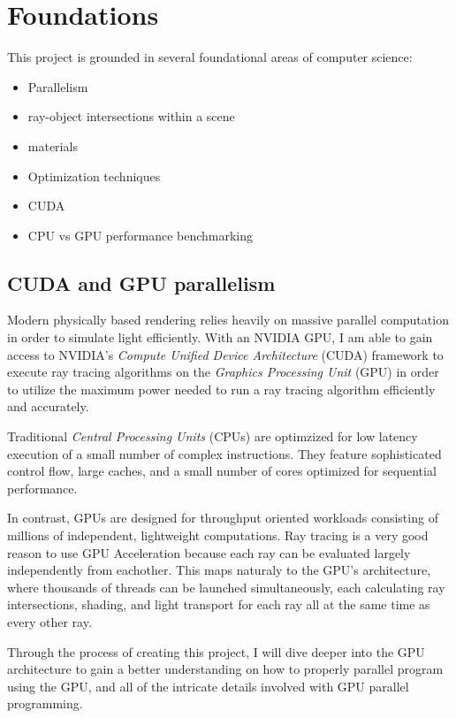\documentclass[11pt]{article}
\begin{document}
\section{Foundations}

This project is grounded in several foundational areas of computer science:

\begin{itemize}
    \item{Parallelism}
    \item{ray-object intersections within a scene}
    \item{materials}
    \item{Optimization techniques}
    \item{CUDA}
    \item{CPU vs GPU performance benchmarking}
\end{itemize}

\subsection{CUDA and GPU parallelism}

Modern physically based rendering relies heavily on massive parallel computation in order to simulate light efficiently. With an NVIDIA GPU, I am able to gain access to NVIDIA's \textit{Compute Unified Device Architecture} (CUDA) framework to execute ray tracing algorithms on the \textit{Graphics Processing Unit} (GPU) in order to utilize the maximum power needed to run a ray tracing algorithm efficiently and accurately.

Traditional \textit{Central Processing Units} (CPUs) are optimzized for low latency execution of a small number of complex instructions. They feature sophisticated control flow, large caches, and a small number of cores optimized for sequential performance.

In contrast, GPUs are designed for throughput oriented workloads consisting of millions of independent, lightweight computations. Ray tracing is a very good reason to use GPU Acceleration because each ray can be evaluated largely independently from eachother. This maps naturaly to the GPU's architecture, where thousands of threads can be launched simultaneously, each calculating ray intersections, shading, and light transport for each ray all at the same time as every other ray. 

Through the process of creating this project, I will dive deeper into the GPU architecture to gain a better understanding on how to properly parallel program using the GPU, and all of the intricate details involved with GPU parallel programming. 
\end{document}
